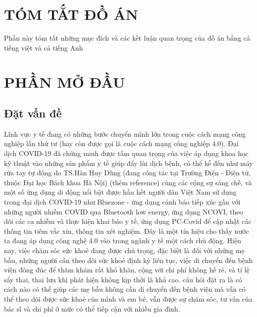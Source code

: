 \documentclass{article}%
\renewcommand{\tablename}{\fontsize{12pt}{0pt}\selectfont \bfseries Bảng} %
\begin{document}
{
\let\oldnumberline\numberline
\renewcommand{\numberline}{\tablename~\oldnumberline}%
\listoftables
} %
\cleardoublepage

\section*{TÓM TẮT ĐỒ ÁN}
Phần này tóm tắt những mục đích và các kết luận quan trọng của đồ án bằng cả tiếng việt và cả tiếng Anh
\cleardoublepage

\section*{PHẦN MỞ ĐẦU}
\subsection*{Đặt vấn đề}
Lĩnh vực y tế đang có những bước chuyển mình lớn trong cuộc cách mạng công nghiệp lần thứ tư 
(hay còn được gọi là cuộc cách mạng công nghiệp 4.0). Đại dịch COVID-19 đã chứng minh được tầm quan trọng của việc áp dụng
khoa học kỹ thuật vào những sản phẩm y tế giúp đẩy lùi dịch bệnh,
có thể kể đến như máy rửa tay tự động do TS.Hàn Huy Dũng (đang công tác tại Trường Điện - Điện tử, thuộc Đại học Bách khoa Hà Nội) 
(thêm reference) cùng các cộng sự sáng chế, và một số ứng dụng di động
nổi bật được hầu hết người dân Việt Nam sử dụng trong đại dịch COVID-19 như Bluezone - ứng dụng cảnh báo tiếp xúc gần với
những người nhiễm COVID qua Bluetooth low energy, ứng dụng NCOVI, theo dõi các ca nhiễm và thực hiện khai báo y tế, ứng
dụng PC-Covid để cập nhật các thông tin tiêm vắc xin, thông tin xét nghiệm. Đây là một tín hiệu cho thấy nước ta đang áp
dụng công nghệ 4.0 vào trong ngành y tế một cách chủ động. Hiện nay, việc chăm sóc sức khoẻ đang được chú trọng, đặc biệt
là đối với những mẹ bầu, những người cần theo dõi sức khoẻ định kỳ liên tục, việc di chuyển đến bệnh viện đông đúc để
thăm khám rất khó khăn, cộng với chi phí không hề rẻ, và tỉ lệ sẩy thai, thai lưu khi phát hiện không kịp thời là khá cao.
câu hỏi đặt ra là có cách nào có thể giúp các mẹ bầu không cần di chuyển đến bệnh viện mà vẫn có thể theo dõi được sức khoẻ của mình và
em bé, vẫn được sự chăm sóc, tư vấn của bác sĩ và chi phí ở mức có thể tiếp cận với nhiều gia đình. 
\end{document}
